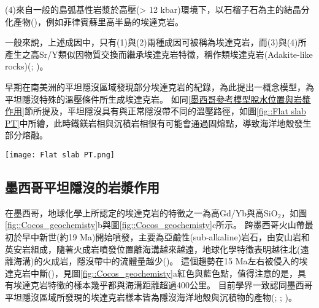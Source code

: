 (4)來自一般的島弧基性岩漿於高壓(> 12 kbar)環境下，以石榴子石為主的結晶分化產物(\citealp{moyen2009high})，例如菲律賓蘇里高半島的埃達克岩。

一般來說，上述成因中，只有(1)與(2)兩種成因可被稱為埃達克岩，而(3)與(4)所產生之高Sr/Y類似因物質交換而繼承埃達克岩特徵，稱作類埃達克岩(Adakite-like rocks)(\citealp{kay2002magmatism}; \citealp{goss2013andean})。

早期在南美洲的平坦隱沒區域發現部分埃達克岩的紀錄，\citet{Gutscher2000Bcan}為此提出一概念模型，為平坦隱沒特殊的溫壓條件所生成埃達克岩。
如同\ref{墨西哥參考模型脫水位置與岩漿作用}節所提及，平坦隱沒具有與正常隱沒帶不同的溫壓路徑，如圖\ref{fig::Flat slab PT}中所繪，此時鐵鎂岩相與沉積岩相很有可能會通過固熔點，導致海洋地殼發生部分熔融。

\begin{figure*}[ht!]
    \centering
    \texttt{[image: Flat slab PT.png]}
    \caption[隱沒板塊頂部可能的溫壓路徑圖，摘自\citet{Gutscher2000Bcan}]{隱沒板塊頂部可能的溫壓路徑圖，摘自\citet{Gutscher2000Bcan}。Ec—榴輝岩(eclogite)，Am—角閃岩(amphibolite)，Ga—石榴石(garnet)，Hb—角閃石(hornblende)。
    圓形為正常隱沒帶中的溫壓路徑，菱形與正方形則為平坦隱沒的溫壓路徑。其中，灰色底部分為隱沒板塊可能的部分熔融區。
    }
    \label{fig::Flat slab PT}
\end{figure*}

\subsection{墨西哥平坦隱沒的岩漿作用}
在墨西哥，地球化學上所認定的埃達克岩的特徵之一為高Gd/Yb與高SiO$_2$，如圖\ref{fig::Cocos_geochemisty}b與圖\ref{fig::Cocos_geochemisty}c所示。
跨墨西哥火山帶最初於早中新世(約19 Ma)開始噴發，主要為亞鹼性(sub-alkaline)岩石，由安山岩和英安岩組成，隨著火成岩噴發位置離海溝越來越遠，地球化學特徵表明越往北(遠離海溝)的火成岩，隱沒帶中的流體量越少(\citealp{ferrari2012dynamic})。
這個趨勢在15 Ma左右被侵入的埃達克岩中斷(\citealp{mori2007effects})，見圖\ref{fig::Cocos_geochemisty}a紅色與藍色點，值得注意的是，具有埃達克岩特徵的樣本幾乎都與海溝距離超過400公里。
目前學界一致認同墨西哥平坦隱沒區域所發現的埃達克岩樣本皆為隱沒海洋地殼與沉積物的產物(\citealp{Gutscher2000Bcan}; \citealp{ferrari2012dynamic}; \citealp{Manea2017})。

